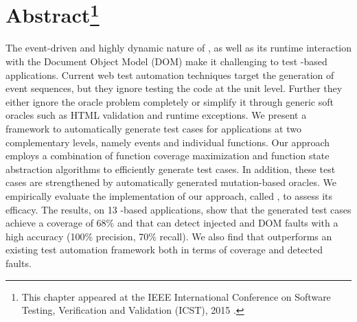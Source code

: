 \section*{Abstract\footnote{This chapter appeared at the IEEE International Conference on Software Testing, Verification and Validation (ICST), 2015 \cite{mirshokraie:icst15}.}}
The event-driven and highly dynamic nature of \javascript, as well as its runtime interaction with the Document Object Model (DOM) make it  challenging to test \javascript-based applications.
Current web test automation techniques target the generation of event sequences, but they ignore testing the \javascript code at the unit level. Further they either ignore the oracle problem completely or simplify it through generic soft oracles such as HTML validation and runtime exceptions. We present a framework to automatically generate test cases for \javascript applications at two complementary levels, namely events and individual \javascript  
functions. 
Our approach employs a combination of function coverage maximization and function state abstraction algorithms to efficiently generate  test cases. In addition, these test cases are strengthened by automatically generated mutation-based oracles. %
We empirically evaluate the implementation of our approach, called \jseft, to assess its efficacy. 
The results, on 13 \javascript-based applications, show that the generated test cases achieve a coverage of 68\% and that \jseft can detect injected \javascript and DOM faults with a high accuracy (100\% precision, 70\% recall).
We also find that \jseft outperforms an existing \javascript test automation framework both in terms of coverage and detected faults.

